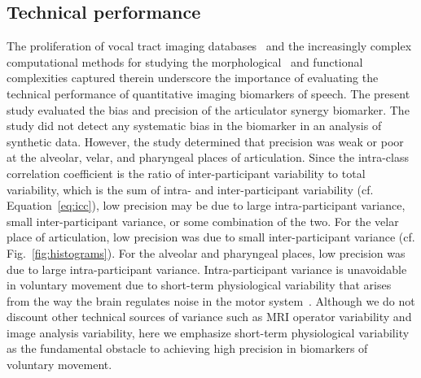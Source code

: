 \documentclass[reprint]{JASAnew}\usepackage[]{graphicx}\usepackage[]{color}
\begin{document}

\subsection{Technical performance}

The proliferation of vocal tract imaging databases~\citep{narayanan2014real,sorensen2017database} and the increasingly complex computational methods for studying the morphological~\citep{lammert2013morphological} and functional~\citep{dawson2016methods} complexities captured therein underscore the importance of evaluating the technical performance of quantitative imaging biomarkers of speech. 
%
The present study evaluated the bias and precision of the articulator synergy biomarker. The study did not detect any systematic bias in the biomarker in an analysis of synthetic data. However, the study determined that precision was weak or poor at the alveolar, velar, and pharyngeal places of articulation. 
%
Since the intra-class correlation coefficient is the ratio of inter-participant variability to total
variability, which is the sum of intra- and inter-participant variability (cf. Equation~\ref{eq:icc}), low precision may be due to large intra-participant variance, small inter-participant variance, or some combination of the two. 
%
For the velar place of articulation, low precision was due to small inter-participant variance (cf. Fig.~\ref{fig:histograms}). 
%
For the alveolar and pharyngeal places, low precision was due to large intra-participant variance.
%
Intra-participant variance is unavoidable in voluntary movement due to short-term physiological variability that arises from the way the brain regulates noise in the motor system~\citep{harris1998signal,van2009motor,wu2014temporal}. 
%
Although we do not discount other technical sources of variance such as MRI operator variability and image analysis variability, here we emphasize short-term physiological variability as the fundamental obstacle to achieving high precision in biomarkers of voluntary movement.
\end{document}
